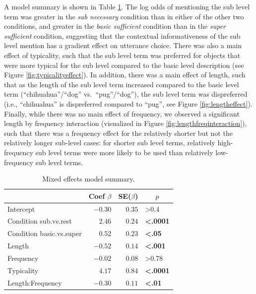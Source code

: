 \documentclass[10pt,letterpaper]{article}
\newcommand{\tableref}[1]{Table \ref{#1}}
\newcommand{\figref}[1]{Figure \ref{#1}}
\begin{document}
A model summary is shown in \tableref{tab:modelresults}. The log odds of mentioning the sub level term was greater in the \emph{sub necessary} condition than in either of the other two conditions, and greater in the \emph{basic sufficient} condition than in the \emph{super sufficient} condition, suggesting that the contextual informativeness of the sub level mention has a gradient effect on utterance choice. There was also a main effect of typicality, such that the sub level term was preferred for objects that were more typical for the sub level compared to the basic level  description (see \figref{fig:typicalityeffect}). In addition, there was a main effect of length, such that as the length of the sub level term increased compared to the basic level term (``chihuahua''/``dog'' vs.~``pug''/``dog''), the sub level term was dispreferred (i.e., ``chihuahua'' is dispreferred compared to ``pug'', see \figref{fig:lengtheffect}). Finally, while there was no main effect of frequency, we observed a significant length by frequency interaction (visualized in \figref{fig:lengthfreqinteraction}), such that there was a frequency effect for the relatively shorter but not the relatively longer sub-level cases: for shorter sub level terms, relatively high-frequency sub level terms were more likely to be used than relatively low-frequency sub level terms. 



\begin{table}[!tbp]
\caption{Mixed effects model summary.}
\begin{center}
\begin{tabular}{lrrl}
\toprule
\multicolumn{1}{l}{}&\multicolumn{1}{c}{Coef $\beta$}&\multicolumn{1}{c}{SE($\beta$)}&\multicolumn{1}{c}{$p$}\tabularnewline
\midrule
Intercept&$-0.30$&$0.35$&\textgreater0.4\tabularnewline
Condition sub.vs.rest&$ 2.46$&$0.24$&\textbf{\textless.0001}\tabularnewline
Condition basic.vs.super&$ 0.52$&$0.23$&\textbf{\textless.05}\tabularnewline
Length&$-0.52$&$0.14$&\textbf{\textless.001}\tabularnewline
Frequency&$-0.02$&$0.08$&\textgreater0.78\tabularnewline
Typicality&$ 4.17$&$0.84$&\textbf{\textless.0001}\tabularnewline
Length:Frequency&$-0.30$&$0.11$&\textbf{\textless.01}\tabularnewline
\bottomrule
\end{tabular}\end{center}
\label{tab:modelresults}
\end{table}
\end{document}
